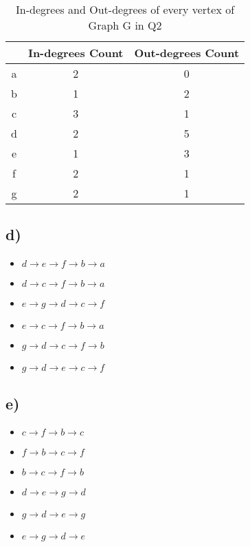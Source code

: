 \documentclass[11pt]{article}
\begin{document}
\begin{table}[H]
    \centering
    \begin{tabular}{|c|c|c|}	
    \hline 							
    & \textbf{In-degrees Count} & \textbf{Out-degrees Count}  \\
    \hline 
    \hline 
    a & 2 & 0 \\ \hline
    b & 1 & 2 \\ \hline
    c & 3 & 1 \\ \hline
    d & 2 & 5 \\ \hline
    e & 1 & 3 \\ \hline
    f & 2 & 1 \\ \hline
    g & 2 & 1 \\ \hline
    \end{tabular}
    \caption{ In-degrees and Out-degrees of every vertex of Graph G in Q2 }
    \end{table}
    
\subsection*{d)}
\begin{itemize}
    \item $d \rightarrow e \rightarrow f \rightarrow b \rightarrow a$
    \item $d \rightarrow c \rightarrow f \rightarrow b \rightarrow a$
    \item $e \rightarrow g \rightarrow d \rightarrow c \rightarrow f$
    \item $e \rightarrow c \rightarrow f \rightarrow b \rightarrow a$
    \item $g \rightarrow d \rightarrow c \rightarrow f \rightarrow b$
    \item $g \rightarrow d \rightarrow e \rightarrow c \rightarrow f$
\end{itemize}
\subsection*{e)}
\begin{itemize}
    \item $c \rightarrow f \rightarrow b \rightarrow c$
    \item $f \rightarrow b \rightarrow c \rightarrow f$
    \item $b \rightarrow c \rightarrow f \rightarrow b$
    \item $d \rightarrow e \rightarrow g \rightarrow d$
    \item $g \rightarrow d \rightarrow e \rightarrow g$
    \item $e \rightarrow g \rightarrow d \rightarrow e$
\end{itemize}
\end{document}
